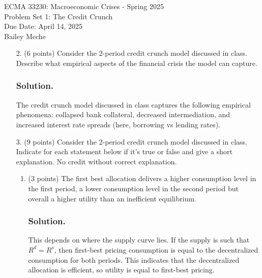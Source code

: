 \documentclass[12pt]{article}
\begin{document}
	\begin{center}
		ECMA 33230: Macroeconomic Crises - Spring 2025\\
        Problem Set 1: The Credit Crunch \\
		Due Date: April 14, 2025 \\
        Bailey Meche
	\end{center}



\begin{enumerate}
    \item[2.] (6 points)  Consider the 2-period credit crunch model discussed in class. Describe what empirical
aspects of the financial crisis the model can capture.
\subsubsection*{Solution.}

The credit crunch model discussed in class captures the following empirical phenomena: collapsed bank collateral, decreased intermediation, and increased interest rate spreads (here, borrowing vs lending rates).


    \item[3.] (9 points) Consider the 2-period credit crunch model discussed in class. Indicate for each statement below if it’s true or false and give a short explanation. No credit without correct explanation.
    \begin{enumerate}
        \item (3 points) The first best allocation delivers a higher consumption level in the first period, a
        lower consumption level in the second period but overall a higher utility than an inefficient
        equilibrium.
        \subsubsection*{Solution.}

        This depends on where the supply curve lies. If the supply is such that $R^d=R^s$, then first-best pricing consumption is equal to the decentralized consumption for both periods. This indicates that the decentralized allocation is efficient, so utility is equal to first-best pricing.


\end{enumerate}
\end{enumerate}
\end{document}
